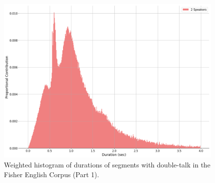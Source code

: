 \documentclass[a4paper]{article}
\begin{document}
\begin{figure}[t]
  \centering
  \includegraphics[width=\linewidth]{figures/dt-dist.png}
  \caption{Weighted histogram of durations of segments with double-talk in the Fisher English Corpus (Part 1).}
  \label{fig:dt-dist}
  \vspace*{-\baselineskip}
\end{figure}
\end{document}
